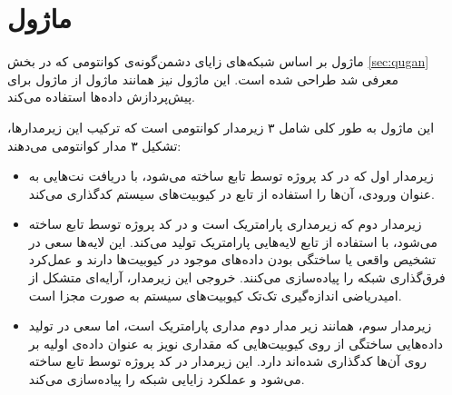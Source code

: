 \section{
ماژول
}
ماژول
بر اساس شبکه‌های زایای دشمن‌گونه‌ی کوانتومی که در بخش
\ref{sec:qugan}
معرفی شد طراحی شده است.
این ماژول نیز همانند ماژول
از ماژول
برای پیش‌پردازش داده‌ها استفاده می‌کند.

این ماژول به طور کلی شامل ۳ زیرمدار کوانتومی است که ترکیب این زیرمدارها، تشکیل ۳ مدار کوانتومی می‌دهند:

\begin{itemize}
    \item زیرمدار اول که در کد پروژه توسط تابع
    ساخته می‌شود، با دریافت نت‌هایی به عنوان ورودی، آن‌ها را استفاده از تابع
    در کیوبیت‌های سیستم کدگذاری می‌کند.
    
    \item زیرمدار دوم که زیرمداری پارامتریک است و در کد پروژه توسط تابع
    ساخته می‌شود، با استفاده از تابع
    لایه‌هایی پارامتریک تولید می‌کند. این لایه‌ها سعی در تشخیص واقعی یا ساختگی بودن داده‌های موجود در کیوبیت‌ها دارند و عمل‌کرد فرق‌گذاری شبکه را پیاده‌سازی می‌کنند.
    خروجی این زیرمدار، آرایه‌ای متشکل از امیدریاضی اندازه‌گیری تک‌تک کیوبیت‌های سیستم به صورت مجزا است.
    
    \item زیرمدار سوم، همانند زیر مدار دوم مداری پارامتریک است، اما سعی در تولید داده‌هایی ساختگی از روی کیوبیت‌هایی که مقداری نویز به عنوان داده‌ی اولیه بر روی آن‌ها کدگذاری شده‌اند دارد. این زیرمدار در کد پروژه توسط تابع
    ساخته می‌شود و عملکرد زایایی شبکه را پیاده‌سازی می‌کند.
\end{itemize}

